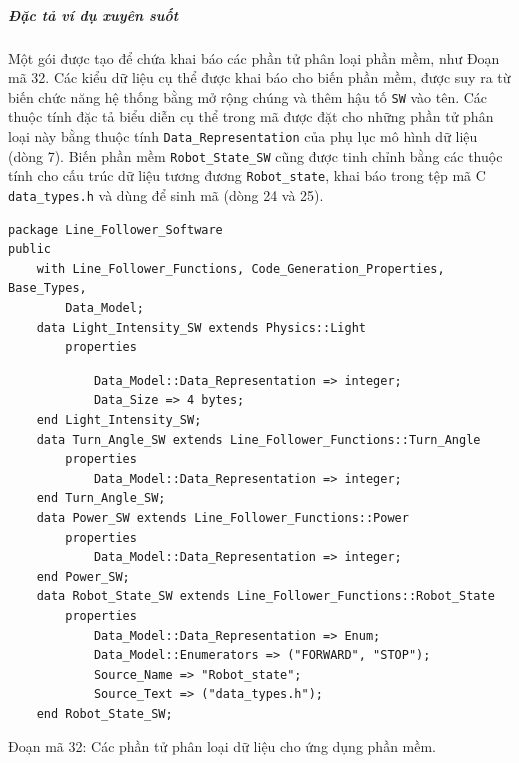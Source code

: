 \subparagraph{Đặc tả ví dụ xuyên suốt}
Một gói được tạo để chứa khai báo các phần tử phân loại phần mềm, như Đoạn mã 32. Các kiểu dữ liệu cụ thể được khai báo cho biến phần mềm, được suy ra từ biến chức năng hệ thống bằng mở rộng chúng và thêm hậu tố \texttt{SW} vào tên. Các thuộc tính đặc tả biểu diễn cụ thể trong mã được đặt cho những phần tử phân loại này bằng thuộc tính \texttt{Data\_Representation} của phụ lục mô hình dữ liệu (dòng 7). Biến phần mềm \texttt{Robot\_State\_SW} cũng được tinh chỉnh bằng các thuộc tính cho cấu trúc dữ liệu tương đương \texttt{Robot\_state}, khai báo trong tệp mã C \texttt{data\_types.h} và dùng để sinh mã (dòng 24 và 25).
\begin{verbatim}
package Line_Follower_Software
public
    with Line_Follower_Functions, Code_Generation_Properties, Base_Types,
        Data_Model;
    data Light_Intensity_SW extends Physics::Light
        properties
\end{verbatim}
\begin{verbatim}
            Data_Model::Data_Representation => integer;
            Data_Size => 4 bytes;
    end Light_Intensity_SW;
    data Turn_Angle_SW extends Line_Follower_Functions::Turn_Angle
        properties
            Data_Model::Data_Representation => integer;
    end Turn_Angle_SW;
    data Power_SW extends Line_Follower_Functions::Power
        properties
            Data_Model::Data_Representation => integer;
    end Power_SW;
    data Robot_State_SW extends Line_Follower_Functions::Robot_State
        properties
            Data_Model::Data_Representation => Enum;
            Data_Model::Enumerators => ("FORWARD", "STOP");
            Source_Name => "Robot_state";
            Source_Text => ("data_types.h");
    end Robot_State_SW;
\end{verbatim}
\begin{center}\small Đoạn mã 32: Các phần tử phân loại dữ liệu cho ứng dụng phần mềm.\end{center}

